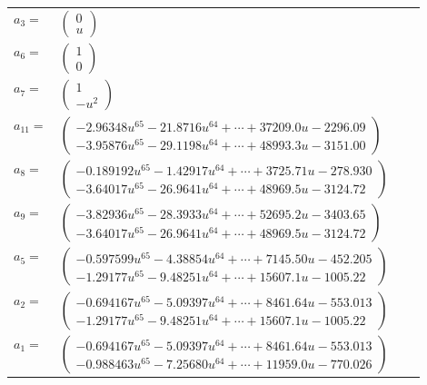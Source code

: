 \documentclass[1p]{elsarticle_modified}
\theoremstyle{definition}
\begin{document}
\begin{tabular}{m{7pt} m{180pt} m{7pt} m{180pt} }
\flushright $a_{3}=$&$\begin{pmatrix}0\\u\end{pmatrix}$ \\
\flushright $a_{6}=$&$\begin{pmatrix}1\\0\end{pmatrix}$ \\
\flushright $a_{7}=$&$\begin{pmatrix}1\\- u^2\end{pmatrix}$ \\
\flushright $a_{11}=$&$\begin{pmatrix}-2.96348 u^{65}-21.8716 u^{64}+\cdots+37209.0 u-2296.09\\-3.95876 u^{65}-29.1198 u^{64}+\cdots+48993.3 u-3151.00\end{pmatrix}$ \\
\flushright $a_{8}=$&$\begin{pmatrix}-0.189192 u^{65}-1.42917 u^{64}+\cdots+3725.71 u-278.930\\-3.64017 u^{65}-26.9641 u^{64}+\cdots+48969.5 u-3124.72\end{pmatrix}$ \\
\flushright $a_{9}=$&$\begin{pmatrix}-3.82936 u^{65}-28.3933 u^{64}+\cdots+52695.2 u-3403.65\\-3.64017 u^{65}-26.9641 u^{64}+\cdots+48969.5 u-3124.72\end{pmatrix}$ \\
\flushright $a_{5}=$&$\begin{pmatrix}-0.597599 u^{65}-4.38854 u^{64}+\cdots+7145.50 u-452.205\\-1.29177 u^{65}-9.48251 u^{64}+\cdots+15607.1 u-1005.22\end{pmatrix}$ \\
\flushright $a_{2}=$&$\begin{pmatrix}-0.694167 u^{65}-5.09397 u^{64}+\cdots+8461.64 u-553.013\\-1.29177 u^{65}-9.48251 u^{64}+\cdots+15607.1 u-1005.22\end{pmatrix}$ \\
\flushright $a_{1}=$&$\begin{pmatrix}-0.694167 u^{65}-5.09397 u^{64}+\cdots+8461.64 u-553.013\\-0.988463 u^{65}-7.25680 u^{64}+\cdots+11959.0 u-770.026\end{pmatrix}$ \\

\end{tabular}
\end{document}

